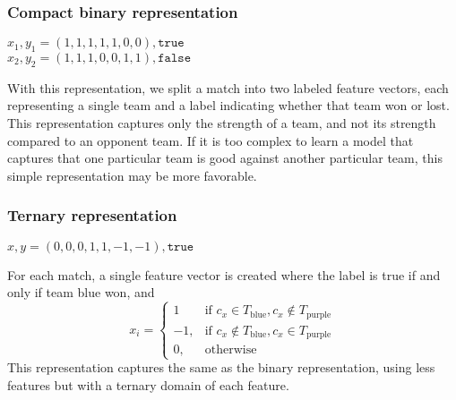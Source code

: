 \subsubsection{Compact binary representation}
\begin{center}
$x_1, y_1 = (1,1,1,1,1,0,0), \texttt{true}$\\
$x_2, y_2 = (1,1,1,0,0,1,1), \texttt{false}$
\end{center}
With this representation, we split a match into two labeled feature vectors, each representing a single team and a label indicating whether that team won or lost.
This representation captures only the strength of a team, and not its strength compared to an opponent team.
If it is too complex to learn a model that captures that one particular team is good against another particular team, this simple representation may be more favorable.

\subsubsection{Ternary representation}
\begin{center}
$x, y = (0,0,0,1,1,-1,-1), \texttt{true}$
\end{center}
For each match, a single feature vector is created where the label is true if and only if team blue won, and
\[
    x_i = 
\begin{cases}
    1 				 & \text{if } c_x \in T_\text{blue}, c_x \not\in T_\text{purple}\\
    -1,              & \text{if } c_x \not\in T_\text{blue}, c_x \in T_\text{purple}\\
    0,              & \text{otherwise}
\end{cases}
\]
This representation captures the same as the binary representation, using less features but with a ternary domain of each feature.


